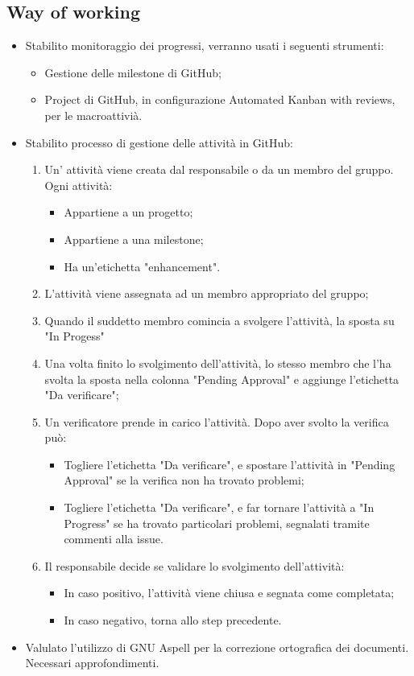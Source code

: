 \documentclass[a4paper, oneside, openany, dvipsnames, table]{article}
\begin{document}
\subsection{Way of working}
\begin{itemize}
\item Stabilito monitoraggio dei progressi, verranno usati i seguenti strumenti:
\begin{itemize}
	\item Gestione delle milestone di GitHub;
	\item Project di GitHub, in configurazione Automated Kanban with reviews, per le macroattivià.
\end{itemize}


\item Stabilito processo di gestione delle attività in GitHub:
	\begin{enumerate}
	\item Un' attività viene creata dal responsabile o da un membro del gruppo. Ogni attività:
		\begin{itemize}
			\item Appartiene a un progetto;
			\item Appartiene a una milestone;
			\item Ha un'etichetta "enhancement".
		\end{itemize}
	\item L'attività viene assegnata ad un membro appropriato del gruppo;
	\item Quando il suddetto membro comincia a svolgere l'attività, la sposta su "In Progess"
	\item Una volta finito lo svolgimento dell'attività, lo stesso membro che l'ha svolta la sposta
		  nella colonna "Pending Approval" e aggiunge l'etichetta "Da verificare";
	\item Un verificatore prende in carico l'attività. Dopo aver svolto la verifica può:
	\begin{itemize}
		\item Togliere l'etichetta "Da verificare", e spostare l'attività in "Pending Approval" se la verifica non ha trovato
			  problemi;
		\item Togliere l'etichetta "Da verificare", e far tornare l'attività a "In Progress" se ha trovato particolari problemi,
		      segnalati tramite commenti alla issue.
	\end{itemize}
	\item Il responsabile decide se validare lo svolgimento dell'attività:
	\begin{itemize}
		\item In caso positivo, l'attività viene chiusa e segnata come completata;
		\item In caso negativo, torna allo step precedente.
	\end{itemize}
	\end{enumerate}	
\item Valulato l'utilizzo di GNU Aspell per la correzione ortografica dei documenti.
	  Necessari approfondimenti.
\end{itemize}




\newpage
\end{document}

